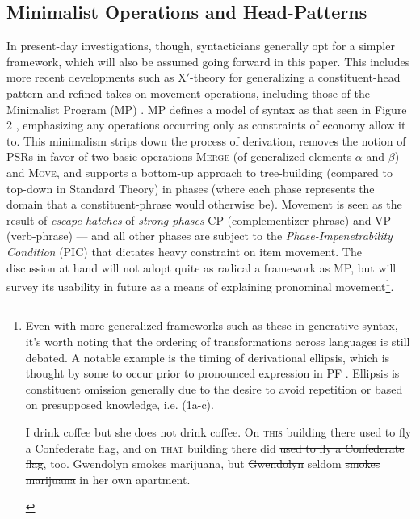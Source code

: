 \documentclass{article}
\begin{document}
\subsection{Minimalist Operations and Head-Patterns}
In present-day investigations, though, syntacticians generally opt for a simpler framework, which will also be assumed going forward in this paper. This includes more recent developments such as X$'$-theory for generalizing a constituent-head pattern and refined takes on movement operations, including those of the Minimalist Program (MP) \citep{Chomsky95}. MP defines a model of syntax as that seen in Figure 2 \citep[p.~2]{Ko14}, emphasizing any operations occurring only as constraints of economy allow it to. This minimalism strips down the process of derivation, removes the notion of PSRs in favor of two basic operations {\scshape Merge} (of generalized elements $\alpha$ and $\beta$) and {\scshape Move}, and supports a bottom-up approach to tree-building (compared to top-down in Standard Theory) in phases (where each phase represents the domain that a constituent-phrase would otherwise be). Movement is seen as the result of \textit{escape-hatches} of \textit{strong phases} CP (complementizer-phrase) and VP (verb-phrase) --- and all other phases are subject to the \textit{Phase-Impenetrability Condition} (PIC) that dictates heavy constraint on item movement. The discussion at hand will not adopt quite as radical a framework as MP, but will survey its usability in future as a means of explaining pronominal movement\footnote{Even with more generalized frameworks such as these in generative syntax, it's worth noting that the ordering of transformations across languages is still debated. A notable example is the timing of derivational ellipsis, which is thought by some to occur prior to pronounced expression in PF \citep{Lipták22}. Ellipsis is constituent omission generally due to the desire to avoid repetition or based on presupposed knowledge, i.e. (1a-c).

\ea \label{Ellipsis}
    \begin{xlist}
        \ex I drink coffee but she does not \sout{drink coffee}.
        \ex On {\scshape this} building there used to fly a Confederate flag, and on {\scshape that} building there did \sout{used to fly a Confederate flag}, too. \citep[p.~107]{Lipták22}
        \ex Gwendolyn smokes marijuana, but \sout{Gwendolyn} seldom \sout{smokes marijuana} in her own apartment. \citep[p.~409]{HankamerSag76}
    \end{xlist}
\z

}.
\end{document}
